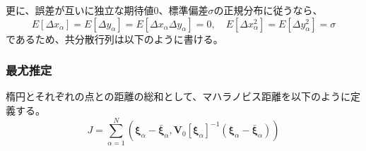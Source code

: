 \documentclass[12pt,a4j]{jsarticle}
\newcommand{\dxa}{\Delta x_\alpha}
\newcommand{\dya}{\Delta y_\alpha}
\newcommand{\xia}{\bm{\xi}_\alpha}
\newcommand{\bxia}{\bar{\bm{\xi}}_\alpha}
\begin{document}
      更に、誤差が互いに独立な期待値$0$、標準偏差$\sigma$の正規分布に従うなら、
      \begin{equation}
        E[\dxa] = E[\dya] = E[\dxa\dya] = 0, \quad E[\dxa^2] = E[\dya^2] = \sigma
      \end{equation}
      であるため、共分散行列は以下のように書ける。
    
    \subsubsection*{最尤推定}
      楕円とそれぞれの点との距離の総和として、マハラノビス距離を以下のように定義する。
      \begin{equation}
        J = \sum_{\alpha = 1}^N \left(\xia - \bxia, \bm{V}_0[\xia]^{-1} (\xia - \bxia) \right)
      \end{equation}
\end{document}
